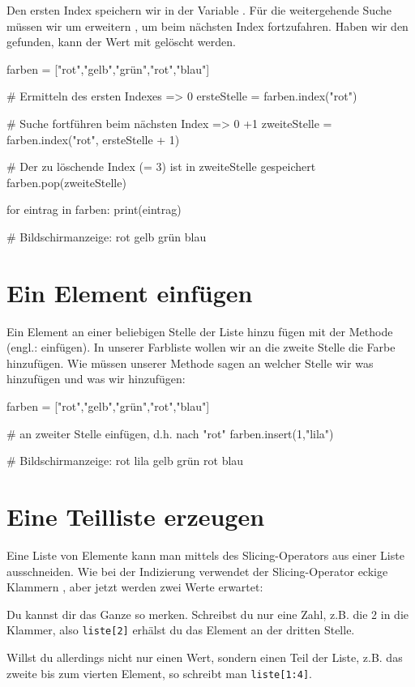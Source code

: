 \documentclass{\VorlagenPfad/coderdojokatext}
\begin{document}
Den ersten Index speichern wir in der Variable  . Für die weitergehende Suche müssen wir  um  erweitern , um beim nächsten Index fortzufahren. Haben wir den gefunden, kann der Wert mit  gelöscht werden.

\begin{pythoncode}
farben = ["rot","gelb","grün","rot","blau"]

# Ermitteln des ersten Indexes => 0
ersteStelle = farben.index("rot")	

# Suche fortführen beim nächsten Index => 0 +1
zweiteStelle = farben.index("rot", ersteStelle + 1) 	

# Der zu löschende Index  (= 3) ist in zweiteStelle gespeichert
farben.pop(zweiteStelle)	

for eintrag in farben:
	print(eintrag)

# Bildschirmanzeige:  rot gelb grün blau
\end{pythoncode}


\section{Ein Element einfügen}

Ein Element an einer beliebigen Stelle der Liste hinzu fügen mit der Methode   (engl.: einfügen).
In unserer Farbliste wollen wir an die zweite Stelle die Farbe  hinzufügen. Wie müssen unserer Methode sagen an welcher Stelle wir was hinzufügen und was wir hinzufügen:

\begin{pythoncode}
farben = ["rot","gelb","grün","rot","blau"]

# an zweiter Stelle einfügen, d.h. nach "rot"
farben.insert(1,"lila")

# Bildschirmanzeige: rot lila gelb grün rot blau
\end{pythoncode}


\section{Eine Teilliste erzeugen}

Eine Liste von Elemente kann man mittels des Slicing-Operators  aus einer Liste ausschneiden. Wie bei der Indizierung verwendet der Slicing-Operator eckige Klammern \code{[..]}, aber jetzt werden zwei Werte erwartet: 


\begin{merkbox}
Du kannst dir das Ganze so merken. Schreibst du nur eine Zahl, z.B. die 2 in die Klammer, also \texttt{liste[2]} erhälst du das Element an der dritten Stelle.

Willst du allerdings nicht nur einen Wert, sondern einen Teil der Liste, z.B. das zweite bis zum vierten Element, so schreibt man \texttt{liste[1:4]}.  
\end{merkbox}
\end{document}
